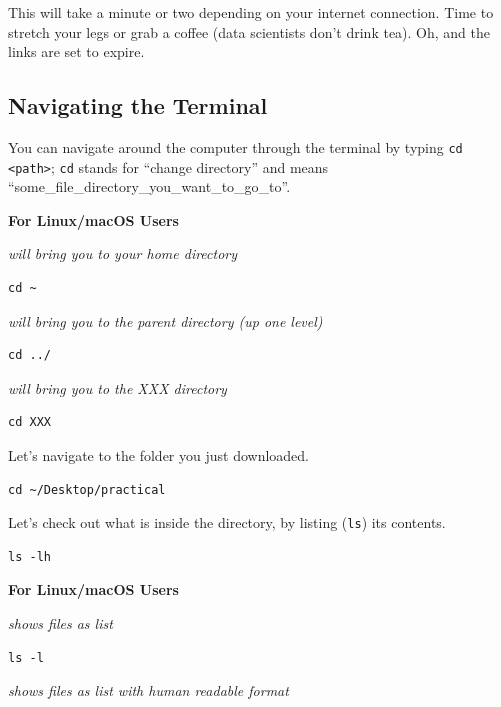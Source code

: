 \documentclass[
]{book}
\newcommand{\passthrough}[1]{#1}
\begin{document}
This will take a minute or two depending on your internet connection. Time to stretch your legs or grab a coffee (data scientists don't drink tea).
Oh, and the links are set to expire.

\hypertarget{navigating-the-terminal}{%
\subsection{Navigating the Terminal}\label{navigating-the-terminal}}

You can navigate around the computer through the terminal by typing \passthrough{\lstinline!cd <path>!}; \passthrough{\lstinline!cd!} stands for ``change directory'' and means ``some\_file\_directory\_you\_want\_to\_go\_to''.

\textbf{For Linux/macOS Users}

\emph{will bring you to your home directory}

\begin{lstlisting}
cd ~ 
\end{lstlisting}

\emph{will bring you to the parent directory (up one level) }

\begin{lstlisting}
cd ../ 
\end{lstlisting}

\emph{will bring you to the XXX directory}

\begin{lstlisting}
cd XXX 
\end{lstlisting}

Let's navigate to the folder you just downloaded.

\begin{lstlisting}
cd ~/Desktop/practical
\end{lstlisting}

Let's check out what is inside the directory, by listing (\passthrough{\lstinline!ls!}) its contents.

\begin{lstlisting}
ls -lh
\end{lstlisting}

\textbf{For Linux/macOS Users}

\emph{shows files as list}

\begin{lstlisting}
ls -l 
\end{lstlisting}

\emph{shows files as list with human readable format }
\end{document}
